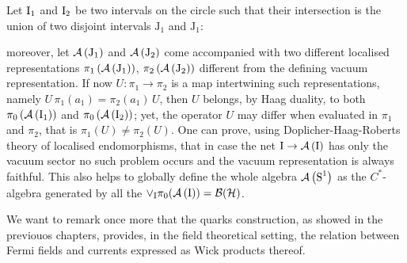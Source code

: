  \begin{example}
 Let $\textrm{I}_1$ and $\textrm{I}_2$ be two intervals on the circle
 such that their intersection is the union of two
 disjoint intervals $\textrm{J}_1$ and $\textrm{J}_1$:
 \begin{figure}[htbp]
 \centering
 \def\first{1.05}
 \def\second{1.15}
 \def\third{1.25}
 \def\rad{0.95}
 \end{figure}
 moreover, let $\mathcal{A}\left(\textrm{J}_1\right)$ and $\mathcal{A}\left(\textrm{J}_2\right)$ come 
 accompanied with two different localised representations
 $\pi_1\left(\mathcal{A}\left(\textrm{J}_1\right)\right)$, 
 $\pi_2\left(\mathcal{A}\left(\textrm{J}_2\right)\right)$ different
 from the defining vacuum representation. If now
 $U\colon\pi_1\to\pi_2$ is a map intertwining such
 representations, namely $U\,\pi_1(a_1)=\pi_2(a_1)\,U$,
 then $U$ belongs, by Haag duality, to both
 $\pi_0\left(\mathcal{A}\left(\textrm{I}_1\right)\right)$ and $\pi_0\left(\mathcal{A}\left(\textrm{I}_2\right)\right)$;
 yet, the operator $U$ may differ when evaluated 
 in $\pi_1$ and $\pi_2$, that is
 $\pi_1(U)\neq\pi_2(U)$. One can prove, using 
 Doplicher-Haag-Roberts theory of localised endomorphisms,
 that in case the net $\textrm{I}\to\mathcal{A}\left(\textrm{I}\right)$ has only the vacuum
 sector no such problem occurs and the vacuum representation
 is always faithful. This also helps to globally define the
 whole algebra $\mathcal{A}\left(\textrm{S}^1\right)$ as the $C^*$-algebra generated by all
 the $\vee_{\textrm{I}}{\pi_0}(\mathcal{A}\left(\textrm{I}\right))=\mathcal{B}(\mathcal{H})$.
 \end{example}
 We want to remark once more that the quarks construction, as
 showed in the previouos chapters, provides, in the field 
 theoretical setting, the relation 
 between Fermi fields and currents expressed 
 as Wick products thereof.
 
